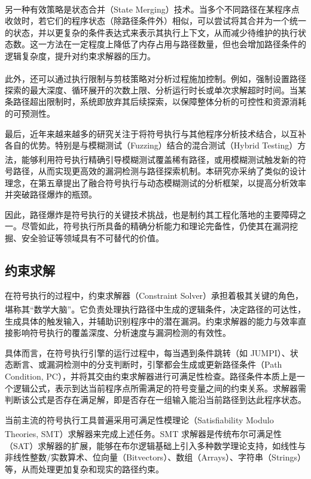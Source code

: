 \documentclass[print, master, vlined, timesmath]{DissertUESTC}
\begin{document}
另一种有效策略是状态合并（State Merging）技术\textsuperscript{\cite{...}}。当多个不同路径在某程序点收敛时，若它们的程序状态（除路径条件外）相似，可以尝试将其合并为一个统一的状态，并以更复杂的条件表达式来表示其执行上下文，从而减少待维护的执行状态数。这一方法在一定程度上降低了内存占用与路径数量，但也会增加路径条件的逻辑复杂度，提升对约束求解器的压力。

此外，还可以通过执行限制与剪枝策略对分析过程施加控制\textsuperscript{\cite{...}}。例如，强制设置路径探索的最大深度、循环展开的次数上限、分析运行时长或单次求解超时时间。当某条路径超出限制时，系统即放弃其后续探索，以保障整体分析的可控性和资源消耗的可预测性。

最后，近年来越来越多的研究关注于将符号执行与其他程序分析技术结合，以互补各自的优势。特别是与模糊测试（Fuzzing）结合的混合测试（Hybrid Testing）方法\textsuperscript{\cite{...}}，能够利用符号执行精确引导模糊测试覆盖稀有路径，或用模糊测试触发新的符号路径，从而实现更高效的漏洞检测与路径探索机制。本研究亦采纳了类似的设计理念，在第五章提出了融合符号执行与动态模糊测试的分析框架，以提高分析效率并突破路径爆炸的瓶颈。

因此，路径爆炸是符号执行的关键技术挑战，也是制约其工程化落地的主要障碍之一。尽管如此，符号执行所具备的精确分析能力和理论完备性，仍使其在漏洞挖掘、安全验证等领域具有不可替代的价值。

\subsection{约束求解}

在符号执行的过程中，约束求解器（Constraint Solver）承担着极其关键的角色，堪称其“数学大脑”\textsuperscript{\cite{...}}。它负责处理执行路径中生成的逻辑条件，决定路径的可达性，生成具体的触发输入，并辅助识别程序中的潜在漏洞。约束求解器的能力与效率直接影响符号执行的覆盖深度、分析速度与漏洞检测的有效性。

具体而言，在符号执行引擎的运行过程中，每当遇到条件跳转（如 JUMPI）、状态断言、或漏洞检测中的分支判断时，引擎都会生成或更新路径条件（Path Condition, PC），并将其交由约束求解器进行可满足性检查。路径条件本质上是一个逻辑公式，表示到达当前程序点所需满足的符号变量之间的约束关系。求解器需判断该公式是否存在满足解，即是否存在一组输入能沿当前路径到达此程序状态。

当前主流的符号执行工具普遍采用可满足性模理论（Satisfiability Modulo Theories, SMT）求解器来完成上述任务\textsuperscript{\cite{...}}。SMT 求解器是传统布尔可满足性（SAT）求解器的扩展，能够在布尔逻辑基础上引入多种数学理论支持，如线性与非线性整数/实数算术、位向量（Bitvectors）、数组（Arrays）、字符串（Strings）等，从而处理更加复杂和现实的路径约束。
\end{document}
